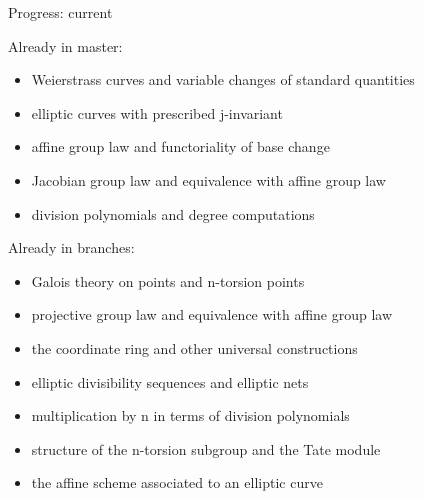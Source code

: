 \documentclass[10pt]{beamer}
\begin{document}
\begin{frame}[t]{Progress: current}

Already in master:
\begin{itemize}
\item Weierstrass curves and variable changes of standard quantities
\item elliptic curves with prescribed j-invariant
\item affine group law and functoriality of base change
\item Jacobian group law and equivalence with affine group law
\item division polynomials and degree computations
\end{itemize}

\pause

Already in branches:
\begin{itemize}
\item Galois theory on points and n-torsion points
\item projective group law and equivalence with affine group law
\item the coordinate ring and other universal constructions
\item elliptic divisibility sequences and elliptic nets
\item multiplication by n in terms of division polynomials
\item structure of the n-torsion subgroup and the Tate module
\item the affine scheme associated to an elliptic curve
\end{itemize}

\end{frame}
\end{document}
